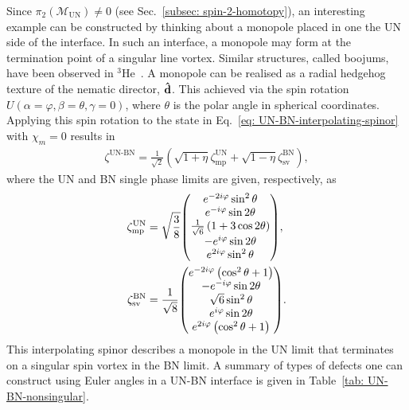 Since \(\pi_2(\mathcal{M}_\text{UN}) \neq 0\) (see
Sec.~\ref{subsec: spin-2-homotopy}), an interesting example can be
constructed by thinking about a monopole placed in one the UN side of the
interface.
In such an interface, a monopole may form at the termination point of a singular
line vortex.
Similar structures, called boojums, have been observed in
\(^3\)He~\cite{Volovik2009, Blaauwgeers2002}.
A monopole can be realised as a radial hedgehog texture of the nematic director,
\(\vb{\hat{d}}\).
This achieved via the spin rotation \(U(\alpha=\varphi, \beta=\theta,
\gamma=0)\), where \(\theta\) is the polar angle in spherical coordinates.
Applying this spin rotation to the state in
Eq.~\eqref{eq: UN-BN-interpolating-spinor} with \(\chi_m=0\) results in
\begin{align}\label{eq: UN-BN-mp-sv}
    \zeta^\text{UN-BN}=\frac{1}{\sqrt{2}}\left(
        \sqrt{1+\eta}\zeta^\text{UN}_\text{mp} + 
        \sqrt{1-\eta}\zeta^\text{BN}_\text{sv}
        \right),
\end{align}
where the UN and BN single phase limits are given, respectively, as
\begin{align}
    \zeta^\text{UN}_\text{mp} &= \sqrt{\frac{3}{8}}
    \mqty(
        e^{-2i\varphi}\sin^2\theta \\
        e^{-i\varphi}\sin 2 \theta \\
        \frac{1}{\sqrt{6}}\left(1+3\cos 2\theta\right) \\
        -e^{i\varphi} \sin 2 \theta \\
        e^{2i\varphi}\sin^2\theta
    ), \\
    \zeta^\text{BN}_\text{sv} &= \frac{1}{\sqrt{8}}
    \mqty(
        e^{-2i\varphi}\left(\cos^2\theta + 1\right) \\
        - e^{-i\varphi}\sin 2 \theta \\
        \sqrt{6}\sin^2\theta \\
        e^{i\varphi}\sin 2 \theta \\
        e^{2i\varphi}\left(\cos^2\theta + 1\right)          
    ).
\end{align}
This interpolating spinor describes a monopole in the UN limit that terminates
on a singular spin vortex in the BN limit.
A summary of types of defects one can construct using Euler angles in a UN-BN
interface is given in Table~\ref{tab: UN-BN-nonsingular}.
